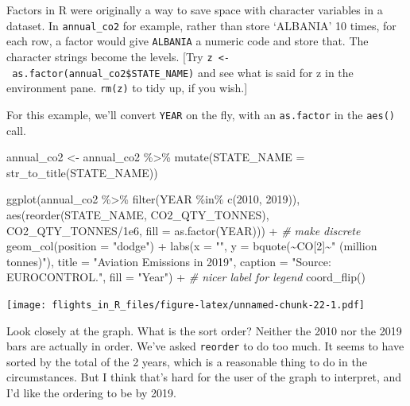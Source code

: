 \documentclass[
]{book}
\newenvironment{Shaded}{\begin{snugshade}}{\end{snugshade}}
\newcommand{\AttributeTok}[1]{\textcolor[rgb]{0.77,0.63,0.00}{#1}}
\newcommand{\CommentTok}[1]{\textcolor[rgb]{0.56,0.35,0.01}{\textit{#1}}}
\newcommand{\DecValTok}[1]{\textcolor[rgb]{0.00,0.00,0.81}{#1}}
\newcommand{\FloatTok}[1]{\textcolor[rgb]{0.00,0.00,0.81}{#1}}
\newcommand{\FunctionTok}[1]{\textcolor[rgb]{0.00,0.00,0.00}{#1}}
\newcommand{\NormalTok}[1]{#1}
\newcommand{\OtherTok}[1]{\textcolor[rgb]{0.56,0.35,0.01}{#1}}
\newcommand{\SpecialCharTok}[1]{\textcolor[rgb]{0.00,0.00,0.00}{#1}}
\newcommand{\StringTok}[1]{\textcolor[rgb]{0.31,0.60,0.02}{#1}}
\begin{document}
Factors in R were originally a way to save space with character variables in a dataset. In \texttt{annual\_co2} for example, rather than store `ALBANIA' 10 times, for each row, a factor would give \texttt{ALBANIA} a numeric code and store that. The character strings become the levels. {[}Try \texttt{z\ \textless{}-\ as.factor(annual\_co2\$STATE\_NAME)} and see what is said for z in the environment pane. \texttt{rm(z)} to tidy up, if you wish.{]}

For this example, we'll convert \texttt{YEAR} on the fly, with an \texttt{as.factor} in the \texttt{aes()} call.

\begin{Shaded}
\begin{Highlighting}[]
\NormalTok{annual\_co2 }\OtherTok{\textless{}{-}}\NormalTok{ annual\_co2 }\SpecialCharTok{\%\textgreater{}\%} 
  \FunctionTok{mutate}\NormalTok{(}\AttributeTok{STATE\_NAME =} \FunctionTok{str\_to\_title}\NormalTok{(STATE\_NAME))}

\FunctionTok{ggplot}\NormalTok{(annual\_co2 }\SpecialCharTok{\%\textgreater{}\%} 
         \FunctionTok{filter}\NormalTok{(YEAR }\SpecialCharTok{\%in\%} \FunctionTok{c}\NormalTok{(}\DecValTok{2010}\NormalTok{, }\DecValTok{2019}\NormalTok{)), }
       \FunctionTok{aes}\NormalTok{(}\FunctionTok{reorder}\NormalTok{(STATE\_NAME, CO2\_QTY\_TONNES),}
\NormalTok{           CO2\_QTY\_TONNES}\SpecialCharTok{/}\FloatTok{1e6}\NormalTok{,}
           \AttributeTok{fill =} \FunctionTok{as.factor}\NormalTok{(YEAR))) }\SpecialCharTok{+}  \CommentTok{\# make discrete}
  \FunctionTok{geom\_col}\NormalTok{(}\AttributeTok{position =} \StringTok{"dodge"}\NormalTok{) }\SpecialCharTok{+}
  \FunctionTok{labs}\NormalTok{(}\AttributeTok{x =} \StringTok{""}\NormalTok{, }
       \AttributeTok{y =} \FunctionTok{bquote}\NormalTok{(}\SpecialCharTok{\textasciitilde{}}\NormalTok{CO[}\DecValTok{2}\NormalTok{]}\SpecialCharTok{\textasciitilde{}}\StringTok{" (million tonnes)"}\NormalTok{),}
       \AttributeTok{title =} \StringTok{"Aviation Emissions in 2019"}\NormalTok{,}
       \AttributeTok{caption =} \StringTok{"Source: EUROCONTROL."}\NormalTok{,}
       \AttributeTok{fill =} \StringTok{"Year"}\NormalTok{) }\SpecialCharTok{+} \CommentTok{\# nicer label for legend}
  \FunctionTok{coord\_flip}\NormalTok{()}
\end{Highlighting}
\end{Shaded}

\texttt{[image: flights\_in\_R\_files/figure-latex/unnamed-chunk-22-1.pdf]}

Look closely at the graph. What is the sort order? Neither the 2010 nor the 2019 bars are actually in order. We've asked \texttt{reorder} to do too much. It seems to have sorted by the total of the 2 years, which is a reasonable thing to do in the circumstances. But I think that's hard for the user of the graph to interpret, and I'd like the ordering to be by 2019.
\end{document}
